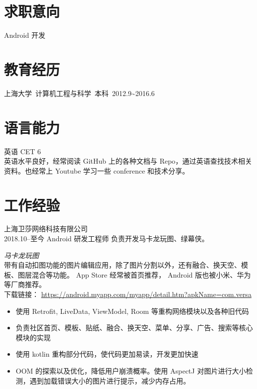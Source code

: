 \documentclass[11pt]{res}
\begin{document}
\address{  beatbox\_gao@hotmail.com\\ GitHub: \url{https://github.com/abcghy} \\ Blog: \url{https://abcghy.github.io/}}
\address{上海长宁 \\ 17602152878 18818217393}

\begin{resume}

\section{求职意向}
  Android 开发

\section{教育经历}
  上海大学\ 计算机工程与科学\ 本科\ 2012.9\~{}2016.6

\section{语言能力}
  英语 CET 6 \\英语水平良好，经常阅读 GitHub 上的各种文档与 Repo，通过英语查找技术相关资料。也经常上 Youtube 学习一些 conference 和技术分享。

\section{工作经验}
\large 上海卫莎网络科技有限公司 \normalsize\\
\small 2018.10--至今 Android 研发工程师 负责开发马卡龙玩图、绿幕侠。\normalsize

    \emph{马卡龙玩图}\\
    带有自动扣图功能的图片编辑应用，除了图片分割以外，还有融合、换天空、模板、图层混合等功能。 App Store 经常被首页推荐， Android 版也被小米、华为等厂商推荐。\\
    下载链接： \url{https://android.myapp.com/myapp/detail.htm?apkName=com.versa}
\begin{itemize}
\item 使用 Retrofit, LiveData, ViewModel, Room 等重构网络模块以及各种旧代码
\item 负责社区首页、模板、贴纸、融合、换天空、菜单、分享、广告、搜索等核心模块的实现
\item 使用 kotlin 重构部分代码，使代码更加易读，开发更加快速
\item OOM 的探索以及优化，降低用户崩溃概率。使用 AspectJ 对图片进行大小检测，遇到加载错误大小的图片进行提示，减少内存占用。%
\end{itemize}


\end{resume}
\end{document}
